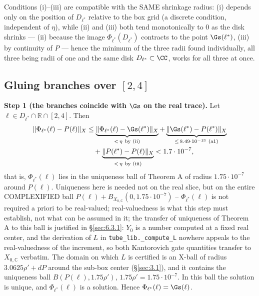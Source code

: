 Conditions (i)--(iii) are compatible with the SAME shrinkage radius: (i) depends only on the position of $D_{\ell^{\ast}}$ relative to the box grid (a discrete condition, independent of $\eta$), while (ii) and (iii) both tend monotonically to $0$ as the disk shrinks --- (ii) because the image $\Phi_{\ell^{\ast}}(D_{\ell^{\ast}})$ contracts to the point $\Gs(\ell^{\ast})$, (iii) by continuity of $P$ --- hence the minimum of the three radii found individually, all three being radii of one and the same disk $D_{\ell^{\ast}}\subset\CC$, works for all three at once.


\subsection{Gluing branches over $[2,4]$}
\label{sec:6.7}

\textbf{Step 1 (the branches coincide with \boldmath$\Gs$ on the real trace).} Let $\ell\in D_{\ell^{\ast}}\cap\mathbb R\cap[2,4]$. Then
\begin{align*}
\|\Phi_{\ell^{\ast}}(\ell)-P(\ell)\|_X
&\le\underbrace{\|\Phi_{\ell^{\ast}}(\ell)-\Gs(\ell^{\ast})\|_X}_{<\,\eta\ \text{by (ii)}}
+\underbrace{\|\Gs(\ell^{\ast})-P(\ell^{\ast})\|_X}_{\le\,8.49\cdot10^{-13}\ \text{(a1)}}\\
&\quad+\underbrace{\|P(\ell^{\ast})-P(\ell)\|_X}_{<\,\eta\ \text{by (iii)}}
<1.7\cdot10^{-7},
\end{align*}
that is, $\Phi_{\ell^{\ast}}(\ell)$ lies in the uniqueness ball of Theorem A of radius $1.75\cdot10^{-7}$ around $P(\ell)$. Uniqueness here is needed not on the real slice, but on the entire COMPLEXIFIED ball $P(\ell)+B_{X_{0,\mathbb C}}(0,1.75\cdot10^{-7})$ -- $\Phi_{\ell^{\ast}}(\ell)$ is not required a priori to be real-valued; real-valuedness is what this step must establish, not what can be assumed in it; the transfer of uniqueness of Theorem A to this ball is justified in \S\ref{sec:6.3.1}: $Y_0$ is a number computed at a fixed real center, and the derivation of $L$ in \texttt{tube\_\allowbreak lib.\_\allowbreak compute\_\allowbreak L} nowhere appeals to the real-valuedness of the increment, so both Kantorovich gate quantities transfer to $X_{0,\mathbb C}$ verbatim. The domain on which $L$ is certified is an X-ball of radius $3.0625\rho'+dP$ around the sub-box center (\S\ref{sec:3.1}), and it contains the uniqueness ball $B(P(\ell),1.75\rho')$, $1.75\rho'=1.75\cdot10^{-7}$. In this ball the solution is unique, and $\Phi_{\ell^{\ast}}(\ell)$ is a solution. Hence $\Phi_{\ell^{\ast}}(\ell)=\Gs(\ell)$.

